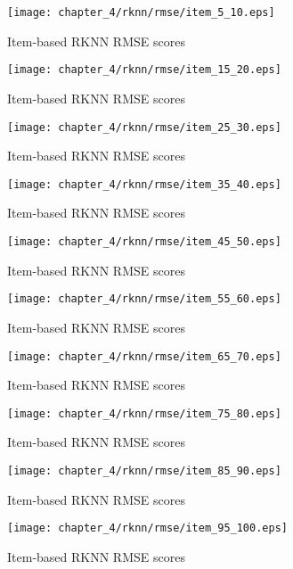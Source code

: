 \begin{figure}[H]
\centering
\texttt{[image: chapter\_4/rknn/rmse/item\_5\_10.eps]}
\caption{Item-based RKNN RMSE scores}
\end{figure}

\begin{figure}[H]
\centering
\texttt{[image: chapter\_4/rknn/rmse/item\_15\_20.eps]}
\caption{Item-based RKNN RMSE scores}
\end{figure}

\begin{figure}[H]
\centering
\texttt{[image: chapter\_4/rknn/rmse/item\_25\_30.eps]}
\caption{Item-based RKNN RMSE scores}
\end{figure}

\begin{figure}[H]
\centering
\texttt{[image: chapter\_4/rknn/rmse/item\_35\_40.eps]}
\caption{Item-based RKNN RMSE scores}
\end{figure}

\begin{figure}[H]
\centering
\texttt{[image: chapter\_4/rknn/rmse/item\_45\_50.eps]}
\caption{Item-based RKNN RMSE scores}
\end{figure}

\begin{figure}[H]
\centering
\texttt{[image: chapter\_4/rknn/rmse/item\_55\_60.eps]}
\caption{Item-based RKNN RMSE scores}
\end{figure}

\begin{figure}[H]
\centering
\texttt{[image: chapter\_4/rknn/rmse/item\_65\_70.eps]}
\caption{Item-based RKNN RMSE scores}
\end{figure}

\begin{figure}[H]
\centering
\texttt{[image: chapter\_4/rknn/rmse/item\_75\_80.eps]}
\caption{Item-based RKNN RMSE scores}
\end{figure}

\begin{figure}[H]
\centering
\texttt{[image: chapter\_4/rknn/rmse/item\_85\_90.eps]}
\caption{Item-based RKNN RMSE scores}
\end{figure}

\begin{figure}[H]
\centering
\texttt{[image: chapter\_4/rknn/rmse/item\_95\_100.eps]}
\caption{Item-based RKNN RMSE scores}
\end{figure}


